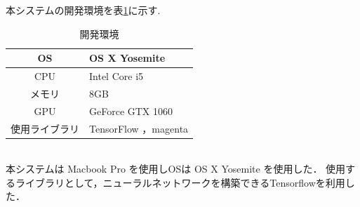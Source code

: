         \newpage
        本システムの開発環境を表\ref{tab:開発環境}に示す.
        \begin{table}[h]
        \begin{center}
        \caption{開発環境}
        \label{tab:開発環境}
        \begin{tabular}{|c|p{}|}
        \hline
        OS & OS X Yosemite\\
        \hline
        CPU & Intel Core i5\\
        \hline
        メモリ & 8GB\\
        \hline
        GPU & GeForce GTX 1060\\
        \hline
        使用ライブラリ & TensorFlow ，magenta\\
        \hline
        \end{tabular}
        \end{center}
        \end{table}\\
        本システムは Macbook Pro を使用しOSは OS X Yosemite を使用した．
使用するライブラリとして，ニューラルネットワークを構築できるTensorflowを利用した．